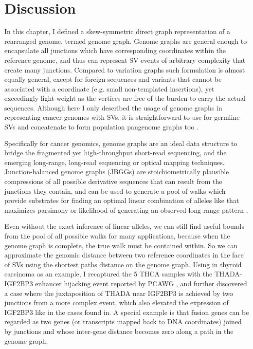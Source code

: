 \documentclass[phd,tocprelim]{cornell}
\begin{document}
\section{Discussion}
In this chapter, I defined a skew-symmetric direct graph representation of a rearranged genome, termed genome graph. Genome graphs are general enough to encapsulate all junctions which have corresponding coordinates within the reference genome, and thus can represent SV events of arbitrary complexity that create many junctions. Compared to variation graphs \cite{Hickey2020-cu} such formulation is almost equally general, except for foreign sequences and variants that cannot be associated with a coordinate (e.g. small non-templated insertions), yet exceedingly light-weight as the vertices are free of the burden to carry the actual sequences. Although here I only described the usage of genome graphs in representing cancer genomes with SVs, it is straightforward to use for germline SVs and concatenate to form population pangenome graphs too \cite{Siren2020-tf,Eizenga2020-cf}.

Specifically for cancer genomics, genome graphs are an ideal data structure to bridge the fragmented yet high-throughput short-read sequencing, and the emerging long-range, long-read sequencing or optical mapping techniques. Junction-balanced genome graphs (JBGGs) are stoichiometrically plausible compressions of all possible derivative sequences that can result from the junctions they contain, and can be used to generate a pool of walks which provide substrates for finding an optimal linear combination of alleles like that maximizes parsimony or likelihood of generating an observed long-range pattern \cite{Hadi2020-um}. 

Even without the exact inference of linear alleles, we can still find useful bounds from the pool of all possible walks for many applications, because when the genome graph is complete, the true walk must be contained within. So we can approximate the genomic distance between two reference coordinates in the face of SVs using the shortest paths distance on the genome graph. Using  in thyroid carcinoma \cite{Panebianco2017-xt} as an example, I recaptured the 5 THCA samples with the THADA-IGF2BP3 enhancer hijacking event reported by PCAWG \cite{Rheinbay2020-no}, and further discovered a case where the juxtaposition of THADA near IGF2BP3 is achieved by two junctions from a more complex event, which also elevated the expression of IGF2BP3 like in the cases found in.  A special example is that fusion genes can be regarded as two genes (or transcripts mapped back to DNA coordinates) joined by junctions and whose inter-gene distance becomes zero along a path in the genome graph. 
\end{document}
